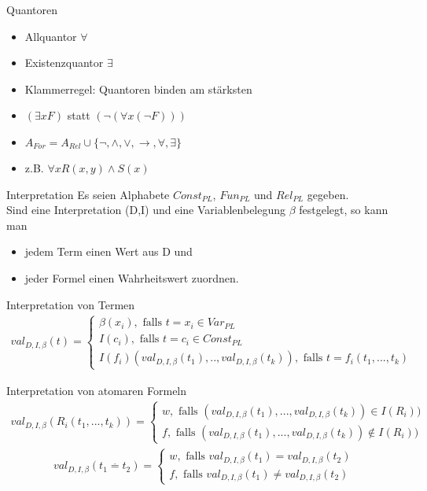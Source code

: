 \begin{frame}{Quantoren}
  \begin{itemize}
    \item Allquantor $\forall$
    \item Existenzquantor $\exists$
    \item Klammerregel: Quantoren binden am stärksten
    \item $(\exists x F)$ statt $(\lnot(\forall x (\lnot F ) ) )$
    \item $A_{For}=A_{Rel}\cup \{\lnot,\land,\lor,\rightarrow,\forall,\exists\}$
    \item z.B. $\forall xR(x,y)\land S(x)$
  \end{itemize}
\end{frame}

\begin{frame}{Interpretation}
  Es seien Alphabete $Const_{PL}$, $Fun_{PL}$ und $Rel_{PL}$ gegeben.\\
  Sind eine Interpretation (D,I) und eine Variablenbelegung $\beta$ festgelegt, so kann man
  \begin{itemize}
    \item jedem Term einen Wert aus D und
    \item jeder Formel einen Wahrheitswert zuordnen.
  \end{itemize}
\end{frame}

\begin{frame}{Interpretation von Termen}
  \begin{align*}
    val_{D,I,\beta}(t)= \begin{cases} \beta(x_i), \text{ falls }t=x_i \in Var_{PL} \\ 
    I(c_i), \text{ falls } t=c_i \in Const_{PL} \\
    I(f_i)(val_{D,I,\beta}(t_1),..,val_{D,I,\beta}(t_k)) , \text{ falls } t=f_i(t_1,...,t_k)
    \end{cases}
  \end{align*}
\end{frame}

\begin{frame}{Interpretation von atomaren Formeln}
  \begin{align*}
    val_{D,I,\beta}(R_i(t_1,...,t_k))= \begin{cases} w, \text{ falls }(val_{D,I,\beta}(t_1),...,val_{D,I,\beta}(t_k))\in I(R_i)) \\ 
    f, \text{ falls }(val_{D,I,\beta}(t_1),...,val_{D,I,\beta}(t_k))\notin I(R_i))
    \end{cases}
  \end{align*}
  \begin{align*}
    val_{D,I,\beta}(t_1\stackrel{.}{=}t_2)= \begin{cases} w, \text{ falls }val_{D,I,\beta}(t_1)=val_{D,I,\beta}(t_2) \\ 
    f, \text{ falls }val_{D,I,\beta}(t_1)\neq val_{D,I,\beta}(t_2)
    \end{cases}
  \end{align*}
\end{frame}

